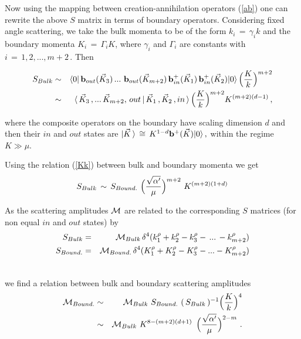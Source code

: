 \documentclass[a4paper,twocolumn,prd,groupedaddress,nofootinbib]{revtex4}
\begin{document}
Now using the mapping between creation-annihilation operators 
(\ref{ab}) one can rewrite the above $S$ matrix in terms of 
boundary operators.
Considering fixed angle scattering, we take the bulk momenta 
to be of the form
$ k_i \,=\, \gamma_i k$ and the boundary momenta 
$ K_i \,=\, \Gamma_i K$, where
$\gamma_i $ and $\Gamma_i$ are constants with $i\,=\,1,2,...,m+2\,$. 
Then
\begin{widetext}
\begin{eqnarray}
S_{Bulk}&\sim &  \langle  0 \vert \,{\bf b}_{out} ( {\vec K}_3 )\,... \,
\,{\bf b}_{out} ({\vec K}_{m+2})   
\,{\bf b}^+_{in }( {\vec K}_1)\, {\bf b}^+_{in} ({\vec K}_2) \vert 0 \rangle  
\,\Big({ K \over k}\Big)^{m + 2 } \nonumber\\
&\sim& \, \langle  \,{\vec K}_3 \,,... \,{\vec K}_{m+2},\,out \,\vert \,{\vec K}_1 \,,
{\vec K}_2 \,,in\,\rangle \, \Big( { K \over k} \Big)^{m+ 2} K^{(m+2)(d-1) }\,,
\end{eqnarray}
\end{widetext}
\noindent where the composite operators on the boundary have  scaling dimension $d$
and then their $in$ and $out$ states are 
$ \vert \vec K \,\rangle \,\cong\, K^{ 1 - d } {\bf b}^+ (\vec K ) \vert 0 \rangle \,,$
within the regime $K \gg \mu$.


Using the relation (\ref{Kk}) between bulk and boundary momenta we get
\begin{equation}
S_{Bulk} \, \sim \,  
 S_{Bound.} \,\,\Big( {\sqrt{\alpha^\prime} \over \mu }\Big)^{m+2} \,\, K^{(m+2)(1+d)}
\end{equation}

As the scattering amplitudes ${\cal M}$ are related to  the corresponding $S$ matrices 
(for non equal $in$ and $out$ states) by
\begin{eqnarray}
S_{Bulk} &=& {\cal M}_{Bulk} \, \delta^4 (  k_1^\rho +  k_2^\rho -  k_3^\rho - \,...\,- 
 k_{m+2}^\rho )
\nonumber\\
 S_{Bound.} &=& {\cal M}_{Bound.} \, \delta^4 ( K_1^\rho +  K_2^\rho 
- K_3^\rho - ... -K_{m+2}^\rho  )\nonumber\\
& &
\end{eqnarray}

\noindent we find a relation between bulk and boundary scattering amplitudes
\begin{eqnarray}
\label{Mb}
{\cal M}_{Bound.} &\sim& {\cal M}_{Bulk}\,\,  S_{Bound.}\,\, (\, S_{Bulk}\,)^{-1} 
\Big( { K\over k} \Big)^4 \nonumber\\
&\sim&  {\cal M}_{Bulk}\, \,K^{8 -  (m+2)(d + 1)  } \,\,\,
\Big( {\sqrt{\alpha^\prime} \over \mu }\Big)^{2 - m}\,\,.
\end{eqnarray}
\end{document}
